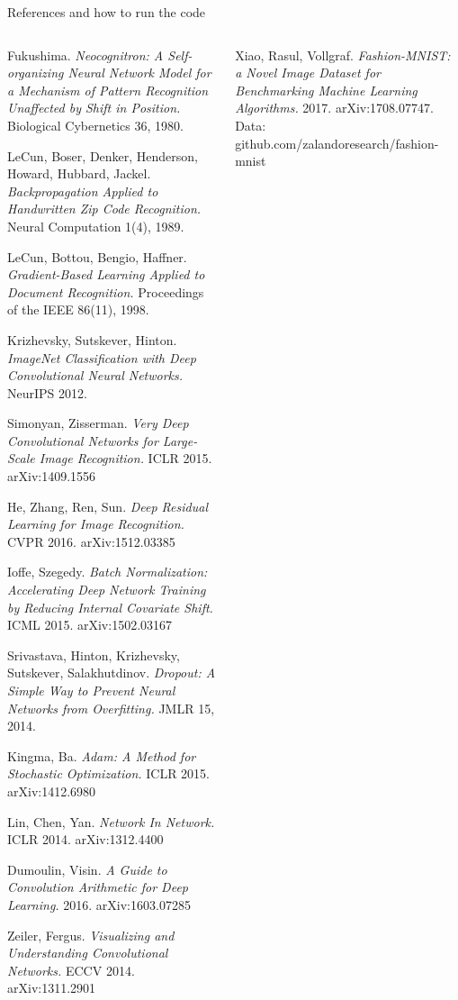 \documentclass[aspectratio=169,10pt]{beamer}
\begin{document}
\begin{frame}{References and how to run the code}
\fontsize{6.4}{7.9}\selectfont
\begin{columns}[T,onlytextwidth]
\begin{enumerate}[{[1]}]\setlength{\itemsep}{0.6pt}
\item Fukushima. \emph{Neocognitron: A Self-organizing Neural Network Model for a Mechanism of Pattern Recognition Unaffected by Shift in Position.} Biological Cybernetics 36, 1980.
\item LeCun, Boser, Denker, Henderson, Howard, Hubbard, Jackel. \emph{Backpropagation Applied to Handwritten Zip Code Recognition.} Neural Computation 1(4), 1989.
\item LeCun, Bottou, Bengio, Haffner. \emph{Gradient-Based Learning Applied to Document Recognition.} Proceedings of the IEEE 86(11), 1998.
\item Krizhevsky, Sutskever, Hinton. \emph{ImageNet Classification with Deep Convolutional Neural Networks.} NeurIPS 2012.
\item Simonyan, Zisserman. \emph{Very Deep Convolutional Networks for Large-Scale Image Recognition.} ICLR 2015. arXiv:1409.1556
\item He, Zhang, Ren, Sun. \emph{Deep Residual Learning for Image Recognition.} CVPR 2016. arXiv:1512.03385
\item Ioffe, Szegedy. \emph{Batch Normalization: Accelerating Deep Network Training by Reducing Internal Covariate Shift.} ICML 2015. arXiv:1502.03167
\item Srivastava, Hinton, Krizhevsky, Sutskever, Salakhutdinov. \emph{Dropout: A Simple Way to Prevent Neural Networks from Overfitting.} JMLR 15, 2014.
\item Kingma, Ba. \emph{Adam: A Method for Stochastic Optimization.} ICLR 2015. arXiv:1412.6980
\item Lin, Chen, Yan. \emph{Network In Network.} ICLR 2014. arXiv:1312.4400
\item Dumoulin, Visin. \emph{A Guide to Convolution Arithmetic for Deep Learning.} 2016. arXiv:1603.07285
\item Zeiler, Fergus. \emph{Visualizing and Understanding Convolutional Networks.} ECCV 2014. arXiv:1311.2901
\end{enumerate}
\begin{enumerate}[{[1]}]\setlength{\itemsep}{0.6pt}
\setcounter{enumi}{12}
\item Xiao, Rasul, Vollgraf. \emph{Fashion-MNIST: a Novel Image Dataset for Benchmarking Machine Learning Algorithms.} 2017. arXiv:1708.07747. Data: github.com/zalandoresearch/fashion-mnist

\end{enumerate}
\end{columns}
\end{frame}
\end{document}
